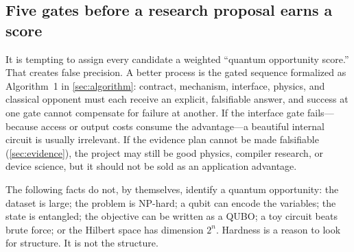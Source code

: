\subsection{Five gates before a research proposal earns a score}

It is tempting to assign every candidate a weighted ``quantum opportunity score.'' That creates false precision. A better process is the gated sequence formalized as Algorithm~1 in \cref{sec:algorithm}: contract, mechanism, interface, physics, and classical opponent must each receive an explicit, falsifiable answer, and success at one gate cannot compensate for failure at another. If the interface gate fails---because access or output costs consume the advantage---a beautiful internal circuit is usually irrelevant. If the evidence plan cannot be made falsifiable (\cref{sec:evidence}), the project may still be good physics, compiler research, or device science, but it should not be sold as an application advantage.

\begin{warningbox}
The following facts do not, by themselves, identify a quantum opportunity: the dataset is large; the problem is NP-hard; a qubit can encode the variables; the state is entangled; the objective can be written as a QUBO; a toy circuit beats brute force; or the Hilbert space has dimension $2^n$. Hardness is a reason to look for structure. It is not the structure.
\end{warningbox}

